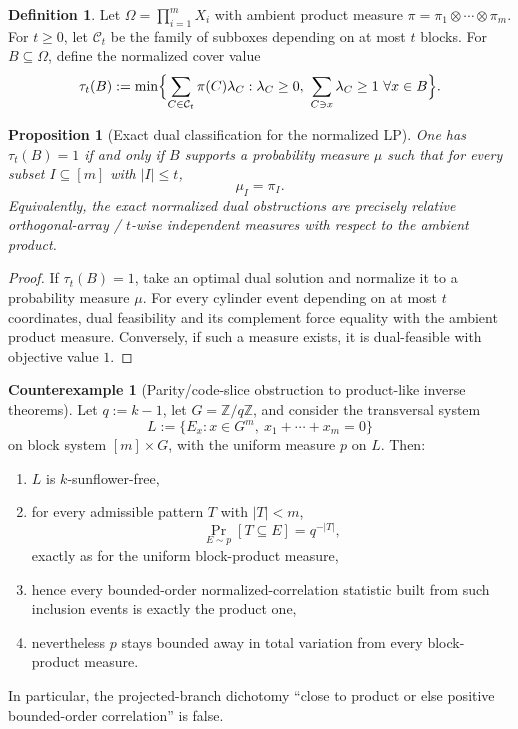 \documentclass[11pt]{article}
\newtheorem{proposition}[theorem]{Proposition}
\theoremstyle{definition}
\newtheorem{definition}[theorem]{Definition}
\newtheorem{counterexample}[theorem]{Counterexample}
\newcommand{\Z}{\mathbb{Z}}
\newcommand{\1}{\mathbf{1}}
\begin{document}
\begin{definition}
Let $\Omega=\prod_{i=1}^m X_i$ with ambient product measure $\pi=\pi_1\otimes\cdots\otimes\pi_m$. For $t\ge 0$, let $\mathcal C_t$ be the family of subboxes depending on at most $t$ blocks. For $B\subseteq \Omega$, define the normalized cover value
\[
\tau_t(B):=\min\Bigl\{\sum_{C\in \mathcal C_t} \pi(C)\lambda_C: \lambda_C\ge 0,\ \sum_{C\ni x}\lambda_C\ge 1\ \forall x\in B\Bigr\}.
\]
\end{definition}

\begin{proposition}[Exact dual classification for the normalized LP]\label{prop:oa-dual}
One has $\tau_t(B)=1$ if and only if $B$ supports a probability measure $\mu$ such that for every subset $I\subseteq [m]$ with $|I|\le t$,
\[
\mu_I=\pi_I.
\]
Equivalently, the exact normalized dual obstructions are precisely relative orthogonal-array / $t$-wise independent measures with respect to the ambient product.
\end{proposition}

\begin{proof}
If $\tau_t(B)=1$, take an optimal dual solution and normalize it to a probability measure $\mu$. For every cylinder event depending on at most $t$ coordinates, dual feasibility and its complement force equality with the ambient product measure. Conversely, if such a measure exists, it is dual-feasible with objective value $1$.
\end{proof}

\begin{counterexample}[Parity/code-slice obstruction to product-like inverse theorems]\label{ce:parity-projective}
Let $q:=k-1$, let $G=\Z/q\Z$, and consider the transversal system
\[
L:=\{E_x:x\in G^m,\ x_1+\cdots+x_m=0\}
\]
on block system $[m]\times G$, with the uniform measure $p$ on $L$.
Then:
\begin{enumerate}[label=(\roman*),leftmargin=2.2em]
\item $L$ is $k$-sunflower-free,
\item for every admissible pattern $T$ with $|T|<m$,
\[
\Pr_{E\sim p}[T\subseteq E]=q^{-|T|},
\]
exactly as for the uniform block-product measure,
\item hence every bounded-order normalized-correlation statistic built from such inclusion events is exactly the product one,
\item nevertheless $p$ stays bounded away in total variation from every block-product measure.
\end{enumerate}
In particular, the projected-branch dichotomy ``close to product or else positive bounded-order correlation'' is false.
\end{counterexample}
\end{document}
